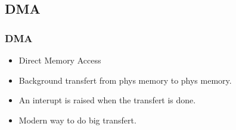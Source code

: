 \subsection{DMA}
\begin{frame}
\frametitle{DMA}
        \begin{itemize}
        \item Direct Memory Access
        \item Background transfert from phys memory to phys memory.
        \item An interupt is raised when the transfert is done.
        \item Modern way to do big transfert.
        \end{itemize}
\end{frame}

\begin{frame}
\begin{center}
\begin{overlayarea}{10cm}{10cm}
\end{overlayarea}
\end{center}
\end{frame}


